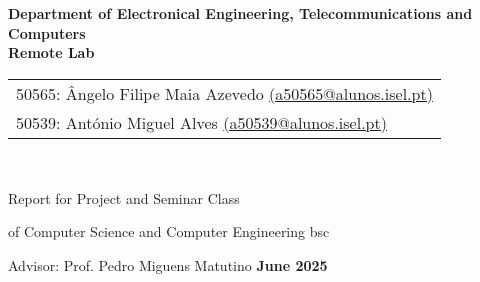 \documentclass[a4paper,openright,twoside,11pt]{report}
\begin{document}
\thispagestyle{empty}

\begin{titlepage}
  \begin{center}
    \begin{minipage}[l]{\textwidth}
        \hspace{-15mm}\\
    \end{minipage}\\[10mm]
    {\large \textbf{Department of Electronical Engineering, Telecommunications and Computers}\\[1.5cm]}
    {\Huge \textbf{Remote Lab}\\[2cm]}    
    {\large \begin{tabular}{l}
      50565: Ângelo Filipe Maia Azevedo \href{mailto:a50565@alunos.isel.pt}{(a50565@alunos.isel.pt)}\\
      50539: António Miguel Alves \href{mailto:a50539@alunos.isel.pt}{(a50539@alunos.isel.pt)}\\
    \end{tabular}\\[3cm] }
    {\large Report for Project and Seminar Class
    
    of Computer Science and Computer Engineering \acs{bsc}\\[3cm]}
    {\large Advisor: Prof. Pedro Miguens Matutino}   
    \vfill
    {\large \textbf{June 2025}}   
  \end{center}
\end{titlepage}

\baselineskip 18pt %

\newpage
\thispagestyle{empty}
\end{document}
